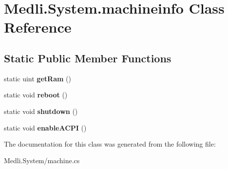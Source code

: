 \hypertarget{class_medli_1_1_system_1_1machineinfo}{}\section{Medli.\+System.\+machineinfo Class Reference}
\label{class_medli_1_1_system_1_1machineinfo}
\subsection*{Static Public Member Functions}
\begin{DoxyCompactItemize}
\item 
\mbox{\label{class_medli_1_1_system_1_1machineinfo_ae01b44fe9915c70c5e94243edc2d6907}} 
static uint {\bfseries get\+Ram} ()
\item 
\mbox{\label{class_medli_1_1_system_1_1machineinfo_ae3eb2fb17cdf107905e3e6c5c3b360cd}} 
static void {\bfseries reboot} ()
\item 
\mbox{\label{class_medli_1_1_system_1_1machineinfo_adaa047ba2150874757e2aa5b50e08cd9}} 
static void {\bfseries shutdown} ()
\item 
\mbox{\label{class_medli_1_1_system_1_1machineinfo_a84f42bd06ecc4d9368421f48bb6b7184}} 
static void {\bfseries enable\+A\+C\+PI} ()
\end{DoxyCompactItemize}


The documentation for this class was generated from the following file\+:\begin{DoxyCompactItemize}
\item 
Medli.\+System/machine.\+cs\end{DoxyCompactItemize}
